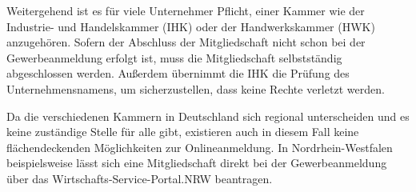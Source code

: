 Weitergehend ist es für viele Unternehmer Pflicht, einer Kammer wie der Industrie- und Handelskammer (IHK) oder der Handwerkskammer (HWK) anzugehören. 
Sofern der Abschluss der Mitgliedschaft nicht schon bei der Gewerbeanmeldung erfolgt ist, muss die Mitgliedschaft selbstständig abgeschlossen werden. 
Außerdem übernimmt die IHK die Prüfung des Unternehmensnamens, um sicherzustellen, dass keine Rechte verletzt werden. 

Da die verschiedenen Kammern in Deutschland sich regional unterscheiden und es keine zuständige Stelle für alle gibt, existieren auch in diesem Fall keine flächendeckenden Möglichkeiten zur Onlineanmeldung. 
In Nordrhein-Westfalen beispielsweise lässt sich eine Mitgliedschaft direkt bei der Gewerbeanmeldung über das Wirtschafts-Service-Portal.NRW beantragen. 

